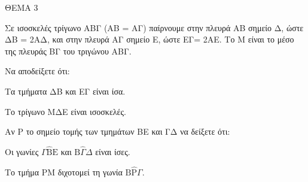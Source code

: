 
ΘΕΜΑ 3

Σε ισοσκελές τρίγωνο ΑΒΓ (ΑΒ = ΑΓ) παίρνουμε στην πλευρά ΑΒ σημείο Δ, ώστε ΔΒ = 2ΑΔ, και στην πλευρά ΑΓ σημείο Ε, ώστε ΕΓ= 2ΑΕ. Το Μ είναι το μέσο της πλευράς ΒΓ του τριγώνου ΑΒΓ.

\begin{alist}
\item Να αποδείξετε ότι:
    \begin{sublist}
      \item Τα τμήματα ΔΒ και ΕΓ είναι ίσα. 
      \item Το τρίγωνο ΜΔΕ είναι ισοσκελές. 
    \end{sublist}


\item Αν Ρ το σημείο τομής των τμημάτων ΒE και ΓΔ να δείξετε ότι:
    \begin{sublist}
      \item Οι γωνίες $\Gamma\widehat{\text{B}}\text{E}$ και $\text{B}\widehat{\Gamma}\Delta$ είναι ίσες. 
      \item Το τμήμα ΡΜ διχοτομεί τη γωνία $\text{B}\widehat{\text{P}}\Gamma$. 
    \end{sublist}

\end{alist}
